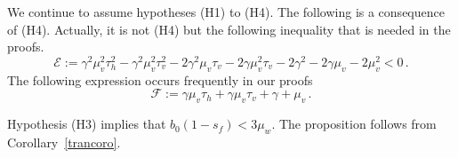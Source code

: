 \documentclass[12pt,leqno]{article}
\begin{document}



We continue to assume hypotheses (H1) to (H4). The following is a consequence of (H4). Actually, it is not (H4) but the following inequality that is needed in the proofs. 
\begin{equation}\label{scriptE}
\mathcal{E} := \gamma^2\mu_v^2\tau_h^2-\gamma^2\mu_v^2\tau_v^2-2\gamma^2\mu_v\tau_v-2\gamma\mu_v^2\tau_v-2\gamma^2-2\gamma\mu_v-2\mu_v^2 < 0\,.
\end{equation}
The following expression occurs frequently in our proofs
\begin{equation}\label{often}
\mathcal{F} := \gamma\mu_v\tau_h+\gamma\mu_v\tau_v+\gamma+\mu_v\,.
\end{equation}

\smallskip

Hypothesis (H3) implies that $b_0(1-s_f) < 3\mu_w$. The proposition follows from Corollary~\ref{trancoro}.\smallskip

\smallskip
\end{document}
